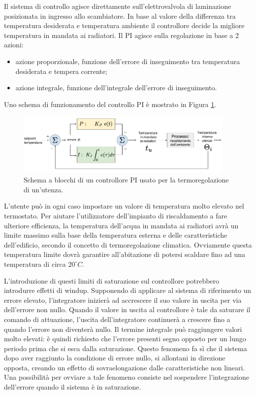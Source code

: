 \documentclass[laurea,oneside,11pt]{USiena_tesiLM3}
\begin{document}
Il sistema di controllo agisce direttamente sull'elettrovalvola di laminazione posizionata in ingresso allo scambiatore. In base al valore della differenza tra temperatura desiderata e temperatura ambiente il controllore decide la migliore temperatura in mandata ai radiatori. Il PI agisce sulla regolazione in base a 2 azioni:
\begin{itemize}
\item azione proporzionale, funzione dell'errore di inseguimento tra temperatura desiderata e tempera corrente;
\item  azione integrale, funzione dell'integrale dell'errore di inseguimento.
\end{itemize}
Uno schema di funzionamento del controllo PI è mostrato in Figura \ref{fig:PI}.

\begin{figure}[!ht]
\centering
\includegraphics[width=0.95\textwidth]{figure/PI} 
\caption{Schema a blocchi di un controllore PI usato per la termoregolazione di un'utenza.}
\label{fig:PI}
\end{figure}
   
L'utente può in ogni caso impostare un valore di temperatura molto elevato nel termostato. Per aiutare l'utilizzatore dell'impianto di riscaldamento a fare ulteriore efficienza, la temperatura dell'acqua in mandata ai radiatori avrà un limite massimo sulla base della temperatura esterna e delle caratteristiche dell'edificio, secondo il concetto di termoregolazione climatica. 
Ovviamente questa temperatura limite dovrà garantire all'abitazione di potersi scaldare fino ad una temperatura di circa $20 ^{\circ}C$.

L'introduzione di questi limiti di saturazione sul controllore potrebbero introdurre effetti di windup.
Supponendo di applicare al sistema di riferimento un errore elevato, l'integratore inizierà ad accrescere il suo valore in uscita per via dell'errore non nullo. Quando il valore in uscita al controllore è tale da saturare il comando di attuazione, l'uscita dell'integratore continuerà a crescere fino a quando l'errore non diventerà nullo.
Il termine integrale può raggiungere valori molto elevati: è quindi richiesto che l'errore presenti segno opposto per un lungo periodo prima che si esca dalla saturazione. 
Questo fenomeno fa sì che il sistema dopo aver raggiunto la condizione di errore nullo, si allontani in direzione opposta, creando un effetto di sovraelongazione dalle caratteristiche non lineari. Una possibilità per ovviare a tale fenomeno consiste nel sospendere l'integrazione dell'errore quando il sistema è in saturazione.\\
\end{document}
